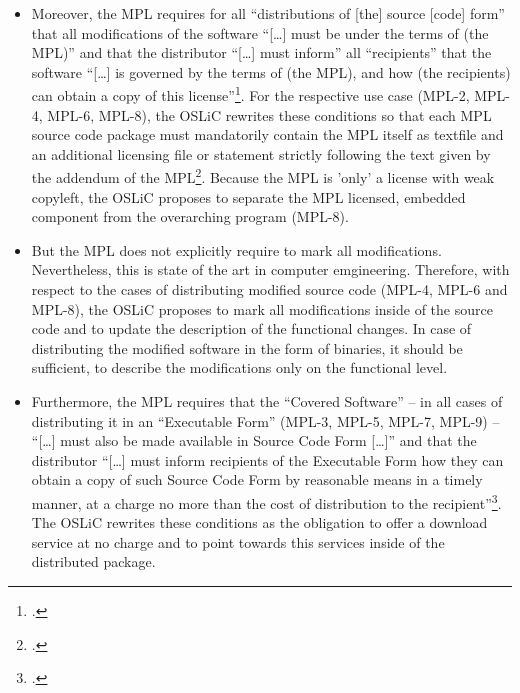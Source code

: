\begin{itemize}
  \item Moreover, the MPL requires for all \enquote{distributions of [the]
  source [code] form} that all modifications of the software \enquote{[\ldots]
  must be under the terms of (the MPL)} and that the distributor
  \enquote{[\ldots] must inform} all \enquote{recipients} that the software
  \enquote{[\ldots] is governed by the terms of (the MPL), and how (the
  recipients) can obtain a copy of this license}\footcite[cf.][\nopage wp\
  §3.1]{Mpl20OsiLicense2013a}. For the respective use case (MPL-2, MPL-4, MPL-6,
  MPL-8), the OSLiC rewrites these conditions so that each MPL source code
  package must mandatorily contain the MPL itself as textfile and an additional
  licensing file or statement strictly following the text given by the addendum
  of the MPL\footcite[cf.][\nopage wp\ Exhibit A]{Mpl20OsiLicense2013a}. Because
  the MPL is 'only' a license with weak copyleft, the OSLiC proposes to separate
  the MPL licensed, embedded component from the overarching program (MPL-8).
  
  \item But the MPL does not explicitly require to mark all modifications.
  Nevertheless, this is state of the art in computer emgineering. Therefore,
  with respect to the cases of distributing modified source code (MPL-4, MPL-6
  and MPL-8), the OSLiC proposes to mark all modifications inside of the source
  code and to update the description of the functional changes. In case of
  distributing the modified software in the form of binaries, it should be
  sufficient, to describe the modifications only on the functional level.
  
  \item Furthermore, the MPL requires that the \enquote{Covered Software} -- in
  all cases of distributing it in an \enquote{Executable Form} (MPL-3, MPL-5,
  MPL-7, MPL-9) -- \enquote{[\ldots] must also be made available in Source Code
  Form [\ldots]} and that the distributor \enquote{[\ldots] must inform
  recipients of the Executable Form how they can obtain a copy of such Source
  Code Form by reasonable means in a timely manner, at a charge no more than the
  cost of distribution to the recipient}\footcite[cf.][\nopage wp\
  §3.2.a]{Mpl20OsiLicense2013a}. The OSLiC rewrites these conditions as the
  obligation to offer a download service at no charge and to point towards this
  services inside of the distributed package.
  

\end{itemize}

